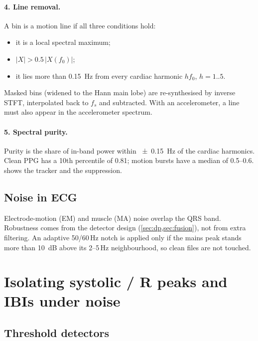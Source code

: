 \documentclass[10pt,a4paper]{article}
\begin{document}
\paragraph{4. Line removal.}
A bin is a motion line if all three conditions hold:
\begin{itemize}
  \item it is a local spectral maximum;
  \item $|X| > 0.5\,|X(f_0)|$;
  \item it lies more than \SI{0.15}{Hz} from every cardiac harmonic $hf_0$, $h=1..5$.
\end{itemize}
Masked bins (widened to the Hann main lobe) are re-synthesised by inverse STFT, interpolated back to $f_s$ and
subtracted. With an accelerometer, a line must also appear in the accelerometer spectrum.

\paragraph{5. Spectral purity.}
Purity is the share of in-band power within \SI{\pm0.15}{Hz} of the cardiac harmonics. Clean PPG has a 10th percentile
of 0.81; motion bursts have a median of 0.5--0.6.  shows the tracker and the suppression.

\subsection{Noise in ECG}
Electrode-motion (EM) and muscle (MA) noise overlap the QRS band. Robustness comes from the detector design
(\cref{sec:dp,sec:fusion}), not from extra filtering. An adaptive 50/60\,Hz notch is applied only if the mains peak
stands more than \SI{10}{dB} above its 2--5\,Hz neighbourhood, so clean files are not touched.

\section{Isolating systolic / R peaks and IBIs under noise}

\subsection{Threshold detectors}
\end{document}
